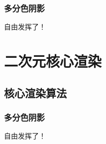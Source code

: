 \documentclass[twoside, 11pt, a4paper]{article}
\numberwithin{equation}{section} %
\begin{document}
\subsubsection{多分色阴影}

{%
自由发挥了！
}


\newpage

\section{二次元核心渲染}

\subsection{核心渲染算法}

\subsubsection{多分色阴影}

{%
自由发挥了！
}
\end{document}
